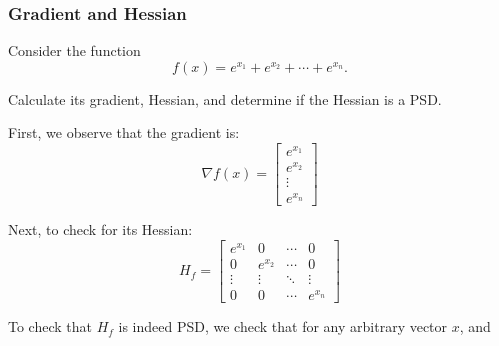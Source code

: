 \documentclass[openany]{book}
\begin{document}
\subsubsection{Gradient and Hessian}
\begin{hw}
	Consider the function
	\begin{equation*}
		f(x) = e^{x_1} + e^{x_2} + \cdots + e^{x_n}.
	\end{equation*}

	Calculate its gradient, Hessian, and determine if the Hessian is a PSD.
\end{hw}
\begin{solution}
	First, we observe that the gradient is:
	\begin{equation*}
		\nabla f(x) = 
		\begin{bmatrix}
			e^{x_1} \\ e^{x_2} \\ \vdots \\ e^{x_n}
		\end{bmatrix}
	\end{equation*}

	Next, to check for its Hessian:
	\begin{equation*}
		H_f = \begin{bmatrix}
			e^{x_1} & 0 & \cdots & 0 \\
			0 & e^{x_2} & \cdots & 0 \\
			\vdots & \vdots & \ddots & \vdots \\
			0 & 0 & \cdots & e^{x_n}
		\end{bmatrix}
	\end{equation*}

	To check that $H_f$ is indeed PSD, we check that for any arbitrary vector $x$, and
\end{solution}
\end{document}
